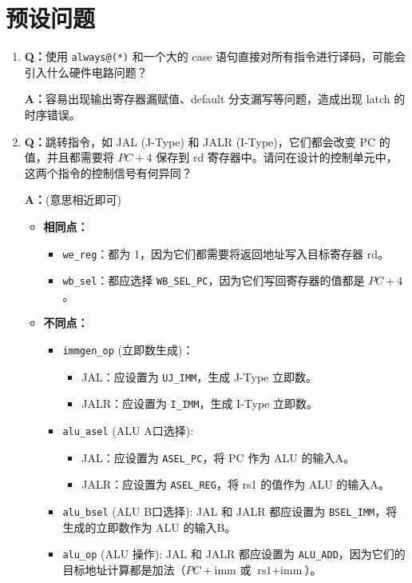 \section{预设问题}
\begin{enumerate}

    \item \textbf{Q：}使用 \texttt{always@(*)} 和一个大的 case 语句直接对所有指令进行译码，可能会引入什么硬件电路问题？
    
    \textbf{A：}容易出现输出寄存器漏赋值、default 分支漏写等问题，造成出现 latch 的时序错误。

    \item \textbf{Q：}跳转指令，如 JAL (J-Type) 和 JALR (I-Type)，它们都会改变 PC 的值，并且都需要将 $PC+4$ 保存到 rd 寄存器中。请问在设计的控制单元中，这两个指令的控制信号有何异同？

    \textbf{A：}(意思相近即可)
    \begin{itemize}
        \item \textbf{相同点：}
        \begin{itemize}
            \item \texttt{we\_reg}：都为 1，因为它们都需要将返回地址写入目标寄存器 rd。
            \item \texttt{wb\_sel}：都应选择 \texttt{WB\_SEL\_PC}，因为它们写回寄存器的值都是 $PC+4$。
        \end{itemize}
        \item \textbf{不同点：}
        \begin{itemize}
            \item \texttt{immgen\_op} (立即数生成)：
                \begin{itemize}
                    \item JAL：应设置为 \texttt{UJ\_IMM}，生成 J-Type 立即数。
                    \item JALR：应设置为 \texttt{I\_IMM}，生成 I-Type 立即数。
                \end{itemize}
            \item \texttt{alu\_asel} (ALU A口选择):
                \begin{itemize}
                    \item JAL：应设置为 \texttt{ASEL\_PC}，将 PC 作为 ALU 的输入A。
                    \item JALR：应设置为 \texttt{ASEL\_REG}，将 rs1 的值作为 ALU 的输入A。
                \end{itemize}
            \item \texttt{alu\_bsel} (ALU B口选择): JAL 和 JALR 都应设置为 \texttt{BSEL\_IMM}，将生成的立即数作为 ALU 的输入B。
            \item \texttt{alu\_op} (ALU 操作): JAL 和 JALR 都应设置为 \texttt{ALU\_ADD}，因为它们的目标地址计算都是加法（$PC + \text{imm}$ 或 $\text{rs1} + \text{imm}$）。
        \end{itemize}
    \end{itemize}


\end{enumerate}
